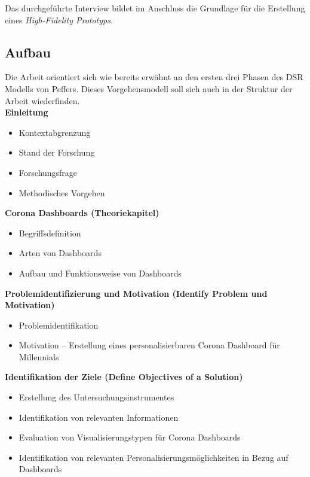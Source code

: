 \documentclass[12pt, oneside]{article}
\begin{document}
Das durchgeführte Interview bildet im Anschluss die Grundlage für die Erstellung eines \textit{High-Fidelity Prototyps}.


\clearpage
\subsection{Aufbau}
Die Arbeit orientiert sich wie bereits erwähnt an den ersten drei Phasen des DSR Modells von Peffers. Dieses Vorgehensmodell soll sich auch in der Struktur der Arbeit wiederfinden.\\

\textbf{Einleitung}
\begin{itemize}
    \item Kontextabgrenzung
    \item Stand der Forschung
    \item Forschungsfrage
    \item Methodisches Vorgehen\\
\end{itemize}

\textbf{Corona Dashboards (Theoriekapitel)}
\begin{itemize}
    \item Begriffsdefinition
    \item Arten von Dashboards
    \item Aufbau und Funktionsweise von Dashboards\\
\end{itemize}


\textbf{Problemidentifizierung und Motivation (Identify Problem und Motivation)}
\begin{itemize}
    \item Problemidentifikation
    \item Motivation – Erstellung eines personalisierbaren Corona Dashboard für Millennials\\
\end{itemize}

\textbf{Identifikation der Ziele (Define Objectives of a Solution)}
\begin{itemize}
    \item Erstellung des Untersuchungsinstrumentes
    \item Identifikation von relevanten Informationen
    \item Evaluation von Visualisierungstypen für Corona Dashboards
    \item Identifikation von relevanten Personalisierungsmöglichkeiten in Bezug auf Dashboards\\
\end{itemize}
\end{document}
